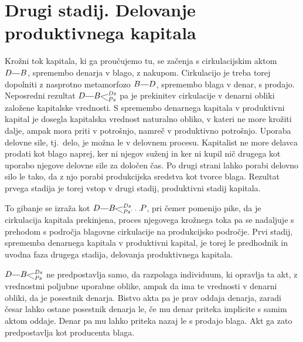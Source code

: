 \documentclass[kapital_02.tex]{subfiles}
\begin{document}
\section{Drugi stadij. Delovanje produktivnega kapitala}

Krožni tok kapitala, ki ga proučujemo tu, se začenja s cirkulacijskim aktom \(\KPED\KPEcrta\KPEB\), spremembo denarja v blago, z nakupom. Cirkulacijo je treba torej dopolniti z nasprotno metamorfozo \(\KPEB\KPEcrta\KPED\), spremembo blaga v denar, s prodajo. Neposredni rezultat \(\KPED\KPEcrta\KPEBrazcepDsPs \) pa je prekinitev cirkulacije v denarni obliki založene kapitalske vrednosti. S spremembo denarnega kapitala v produktivni kapital je dosegla kapitalska vrednost naturalno obliko, v kateri ne more krožiti dalje, ampak mora priti v potrošnjo, namreč v produktivno potrošnjo. Uporaba delovne sile, tj.\ delo, je možna le v delovnem procesu. Kapitalist ne more delavca prodati kot blago naprej, ker ni njegov suženj in ker ni kupil nič drugega kot uporabo njegove delovne sile za določen čas. Po drugi strani lahko porabi delovno silo le tako, da z njo porabi produkcijska sredstva kot tvorce blaga. Rezultat prvega stadija je torej vstop v drugi stadij, produktivni stadij kapitala.

To gibanje se izraža kot \(\KPED\KPEcrta\KPEBrazcepDsPs\KPEpike\KPEP \), pri čemer pomenijo pike, da je cirkulacija kapitala prekinjena, proces njegovega krožnega toka pa se nadaljuje s prehodom s področja blagovne cirkulacije na produkcijsko področje. Prvi stadij, sprememba denarnega kapitala v produktivni kapital, je torej le predhodnik in uvodna faza drugega stadija, delovanja produktivnega kapitala.

\(\KPED\KPEcrta\KPEBrazcepDsPs\) ne predpostavlja samo, da razpolaga individuum, ki opravlja ta akt, z vrednostmi poljubne uporabne oblike, ampak da ima te vrednosti v denarni obliki, da je posestnik denarja. Bistvo akta pa je prav oddaja denarja, zaradi česar lahko ostane posestnik denarja le, če mu denar priteka implicite s samim aktom oddaje. Denar pa mu lahko priteka nazaj le s prodajo blaga. Akt ga zato predpostavlja kot producenta blaga.
\end{document}
